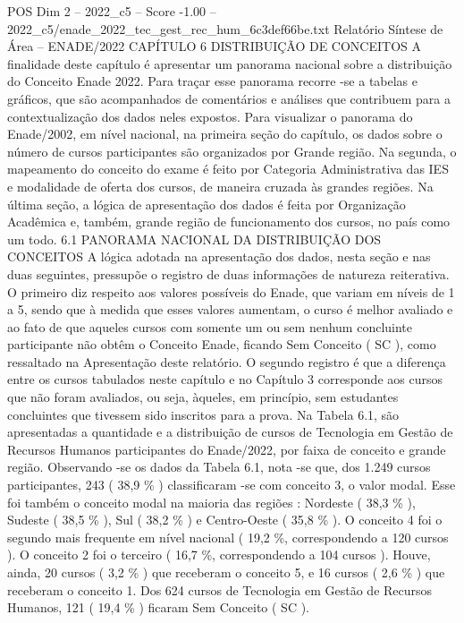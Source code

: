 \begin{textsample}{POS Dim 2 – 2022\_c5 – Score -1.00 – 2022\_c5/enade\_2022\_tec\_gest\_rec\_hum\_6c3def66be.txt}  \label{ex:f2_pos_221}
Relatório Síntese de Área – ENADE/2022 CAPÍTULO 6 DISTRIBUIÇÃO DE CONCEITOS A finalidade deste capítulo é apresentar um panorama nacional sobre a distribuição do Conceito Enade 2022.
Para traçar esse panorama recorre -se a tabelas e gráficos, que são acompanhados de comentários e análises que contribuem para a contextualização dos dados neles expostos.
Para visualizar o panorama do Enade/2002, em nível nacional, na primeira seção do capítulo, os dados sobre o número de cursos participantes são organizados por Grande região.
Na segunda, o mapeamento do conceito do exame é feito por Categoria Administrativa das IES e modalidade de oferta dos cursos, de maneira cruzada às grandes regiões.
Na última seção, a lógica de apresentação dos dados é feita por Organização Acadêmica e, também, grande região de funcionamento dos cursos, no país como um todo. 6.1 PANORAMA NACIONAL DA DISTRIBUIÇÃO DOS CONCEITOS A lógica adotada na apresentação dos dados, nesta seção e nas duas seguintes, pressupõe o registro de duas informações de natureza reiterativa.
O primeiro diz respeito aos valores possíveis do Enade, que variam em níveis de 1 a 5, sendo que à medida que esses valores aumentam, o curso é melhor avaliado e ao fato de que aqueles cursos com somente um ou sem nenhum concluinte participante não obtêm o Conceito Enade, ficando Sem Conceito ( SC ), como ressaltado na Apresentação deste relatório.
O segundo registro é que a diferença entre os cursos tabulados neste capítulo e no Capítulo 3 corresponde aos cursos que não foram avaliados, ou seja, àqueles, em princípio, sem estudantes concluintes que tivessem sido inscritos para a prova.
Na Tabela 6.1, são apresentadas a quantidade e a distribuição de cursos de Tecnologia em Gestão de Recursos Humanos participantes do Enade/2022, por faixa de conceito e grande região.
Observando -se os dados da Tabela 6.1, nota -se que, dos 1.249 cursos participantes, 243 ( 38,9 \% ) classificaram -se com conceito 3, o valor modal.
Esse foi também o conceito modal na maioria das regiões : Nordeste ( 38,3 \% ), Sudeste ( 38,5 \% ), Sul ( 38,2 \% ) e Centro-Oeste ( 35,8 \% ).
O conceito 4 foi o segundo mais frequente em nível nacional ( 19,2 \%, correspondendo a 120 cursos ).
O conceito 2 foi o terceiro ( 16,7 \%, correspondendo a 104 cursos ).
Houve, ainda, 20 cursos ( 3,2 \% ) que receberam o conceito 5, e 16 cursos ( 2,6 \% ) que receberam o conceito 1.
Dos 624 cursos de Tecnologia em Gestão de Recursos Humanos, 121 ( 19,4 \% ) ficaram Sem Conceito ( SC ).

\end{textsample}
